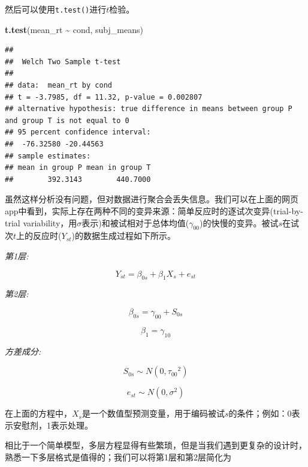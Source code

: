 \documentclass[
]{book}
\newenvironment{Shaded}{\begin{snugshade}}{\end{snugshade}}
\newcommand{\FunctionTok}[1]{\textcolor[rgb]{0.13,0.29,0.53}{\textbf{#1}}}
\newcommand{\NormalTok}[1]{#1}
\newcommand{\SpecialCharTok}[1]{\textcolor[rgb]{0.81,0.36,0.00}{\textbf{#1}}}
\begin{document}
然后可以使用\texttt{t.test()}进行\(t\)检验。

\begin{Shaded}
\begin{Highlighting}[]
\FunctionTok{t.test}\NormalTok{(mean\_rt }\SpecialCharTok{\textasciitilde{}}\NormalTok{ cond, subj\_means)}
\end{Highlighting}
\end{Shaded}

\begin{verbatim}
## 
##  Welch Two Sample t-test
## 
## data:  mean_rt by cond
## t = -3.7985, df = 11.32, p-value = 0.002807
## alternative hypothesis: true difference in means between group P and group T is not equal to 0
## 95 percent confidence interval:
##  -76.32580 -20.44563
## sample estimates:
## mean in group P mean in group T 
##        392.3143        440.7000
\end{verbatim}

虽然这样分析没有问题，但对数据进行聚合会丢失信息。我们可以在上面的网页app中看到，实际上存在两种不同的变异来源：简单反应时的逐试次变异(trial-by-trial variability，用\(\sigma\)表示)和被试相对于总体均值(\(\gamma_{00}\))的快慢的变异。被试\(s\)在试次\(t\)上的反应时(\(Y_{st}\))的数据生成过程如下所示。

\emph{第1层:}

\begin{equation}
Y_{st} = \beta_{0s} + \beta_{1} X_{s} + e_{st}
\end{equation}

\emph{第2层:}

\begin{equation}
\beta_{0s} = \gamma_{00} + S_{0s}
\end{equation}

\begin{equation}
\beta_{1} = \gamma_{10}
\end{equation}

\emph{方差成分:}

\begin{equation}
S_{0s} \sim N\left(0, {\tau_{00}}^2\right) 
\end{equation}

\begin{equation}
e_{st} \sim N\left(0, \sigma^2\right)
\end{equation}

在上面的方程中，\(X_s\)是一个数值型预测变量，用于编码被试\(s\)的条件；例如：0表示安慰剂，1表示处理。

相比于一个简单模型，多层方程显得有些繁琐，但是当我们遇到更复杂的设计时，熟悉一下多层格式是值得的；我们可以将第1层和第2层简化为
\end{document}
